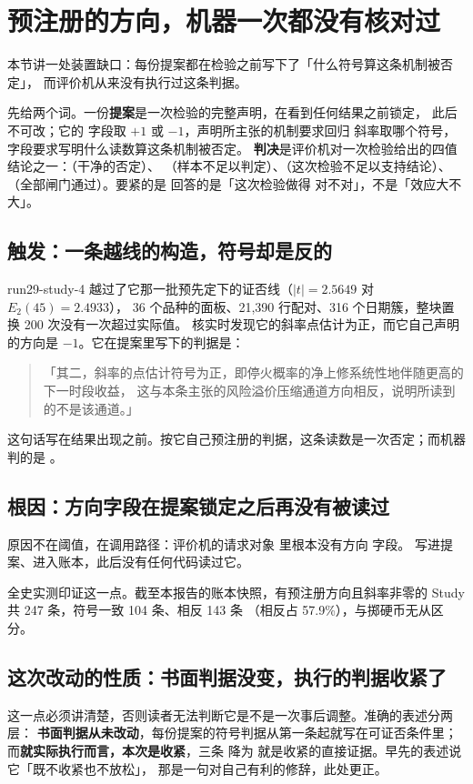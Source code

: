 \documentclass[11pt]{ctexart}
\begin{document}
\section{预注册的方向，机器一次都没有核对过}\label{sec:direction}
本节讲一处装置缺口：每份提案都在检验之前写下了「什么符号算这条机制被否定」，
而评价机从来没有执行过这条判据。

先给两个词。一份\textbf{提案}是一次检验的完整声明，在看到任何结果之前锁定，
此后不可改；它的 字段取 $+1$ 或 $-1$，声明所主张的机制要求回归
斜率取哪个符号， 字段要求写明什么读数算这条机制被否定。
\textbf{判决}是评价机对一次检验给出的四值结论之一：（干净的否定）、
（样本不足以判定）、（这次检验不足以支持结论）、
（全部闸门通过）。要紧的是  回答的是「这次检验做得
对不对」，不是「效应大不大」。

\subsection{触发：一条越线的构造，符号却是反的}
run29-study-4 越过了它那一批预先定下的证否线（$|t|=2.5649$ 对 $E_2(45)=2.4933$），
36 个品种的面板、21{,}390 行配对、316 个日期簇，整块置换 200 次没有一次超过实际值。
核实时发现它的斜率点估计为正，而它自己声明的方向是 $-1$。它在提案里写下的判据是：

\begin{quote}\small
「其二，斜率的点估计符号为正，即停火概率的净上修系统性地伴随更高的下一时段收益，
这与本条主张的风险溢价压缩通道方向相反，说明所读到的不是该通道。」
\end{quote}

这句话写在结果出现之前。按它自己预注册的判据，这条读数是一次否定；而机器判的是
。

\subsection{根因：方向字段在提案锁定之后再没有被读过}
原因不在阈值，在调用路径：评价机的请求对象  里根本没有方向
字段。 写进提案、进入账本，此后没有任何代码读过它。

全史实测印证这一点。截至本报告的账本快照，有预注册方向且斜率非零的 Study 共
247 条，符号一致 104 条、相反 143 条
（相反占 57.9\%），与掷硬币无从区分。

\subsection{这次改动的性质：书面判据没变，执行的判据收紧了}
这一点必须讲清楚，否则读者无法判断它是不是一次事后调整。准确的表述分两层：
\textbf{书面判据从未改动}，每份提案的符号判据从第一条起就写在可证否条件里；
而\textbf{就实际执行而言，本次是收紧}，三条  降为
 就是收紧的直接证据。早先的表述说它「既不收紧也不放松」，
那是一句对自己有利的修辞，此处更正。
\end{document}
